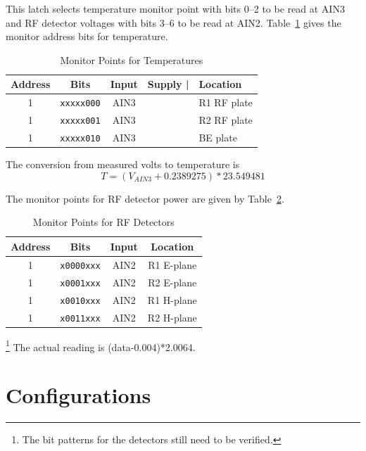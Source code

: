\documentclass[letterpaper,11pt]{book}
\begin{document}
This latch selects temperature monitor point with bits 0--2 to be read at AIN3
and RF detector voltages with bits 3--6 to be read at AIN2.
Table~\ref{tab:T-mon-points} gives the monitor address bits for temperature.
\begin{table}[h!tb]
  \begin{center}
    \caption{\label{tab:T-mon-points}Monitor Points for Temperatures}
    \small \begin{tabular}{|c|c|c|rl|}
\hline  
{\bf Address} & {\bf Bits} & {\bf Input} & {\bf Supply |} & {\bf Location}  \\
\hline
1 & {\tt xxxxx000} & AIN3 & & R1 RF plate  \\
1 & {\tt xxxxx001} & AIN3 & & R2 RF plate  \\
1 & {\tt xxxxx010} & AIN3 & & BE plate     \\
 \hline
    \end{tabular}
  \end{center}
\end{table}
The conversion from measured volts to temperature is
\begin{displaymath}
  T = (V_{AIN3}+0.2389275)*23.549481
\end{displaymath}

The monitor points for RF detector power are given by 
Table~\ref{tab:RF-mon-points}.
\begin{table}[h!tb]
  \begin{center}
    \caption{\label{tab:RF-mon-points}Monitor Points for RF Detectors}
    \small \begin{tabular}{|c|c|c|c|}
     \hline
{\bf Address} & {\bf Bits}     & {\bf Input} & {\bf Location}  \\
\hline
1             & {\tt x0000xxx} & AIN2        & R1 E-plane  \\
1             & {\tt x0001xxx} & AIN2        & R2 E-plane  \\
1             & {\tt x0010xxx} & AIN2        & R1 H-plane \\
1             & {\tt x0011xxx} & AIN2        & R2 H-plane  \\
 \hline
    \end{tabular}
  \end{center}
\end{table}\footnote{The bit patterns for the detectors still need to be
verified.}
The actual reading is (data-0.004)*2.0064.

\chapter{Configurations}\label{chap:config}
\end{document}
